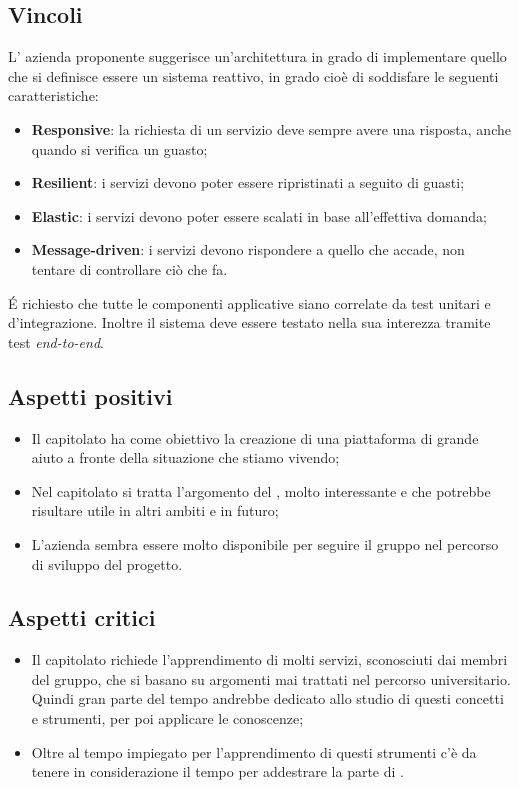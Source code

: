\subsection{Vincoli}
L' azienda proponente suggerisce un'architettura in grado di implementare quello che si definisce essere un sistema reattivo, in grado cioè di soddisfare le seguenti caratteristiche: 
\begin{itemize}
\item \textbf{Responsive}: la richiesta di un servizio deve sempre avere una risposta, anche quando si verifica un guasto; 
\item \textbf{Resilient}: i servizi devono poter essere ripristinati a seguito di guasti; 
\item \textbf{Elastic}: i servizi devono poter essere scalati in base all'effettiva domanda; 
\item \textbf{Message-driven}: i servizi devono rispondere a quello che accade, non tentare di controllare ciò che fa.  
\end{itemize}
\'E richiesto che tutte le componenti applicative siano correlate da test unitari e d'integrazione. Inoltre il sistema deve essere testato nella sua interezza tramite test \textit{end-to-end}. 

\subsection{Aspetti positivi}
\begin{itemize}
\item Il capitolato ha come obiettivo la creazione di una piattaforma di grande aiuto a fronte della situazione che stiamo vivendo;
\item Nel capitolato si tratta l'argomento del , molto interessante e che potrebbe risultare utile in altri ambiti e in futuro;
\item L'azienda sembra essere molto disponibile per seguire il gruppo nel percorso di sviluppo del progetto.
\end{itemize}

\subsection{Aspetti critici}
\begin{itemize}
\item Il capitolato richiede l'apprendimento di molti servizi, sconosciuti dai membri del gruppo, che si basano su argomenti mai trattati nel percorso universitario. Quindi gran parte del tempo andrebbe dedicato allo studio di questi concetti e strumenti, per poi applicare le conoscenze;
\item Oltre al tempo impiegato per l'apprendimento di questi strumenti c'è da tenere in considerazione il tempo per addestrare la parte di .
\end{itemize}


